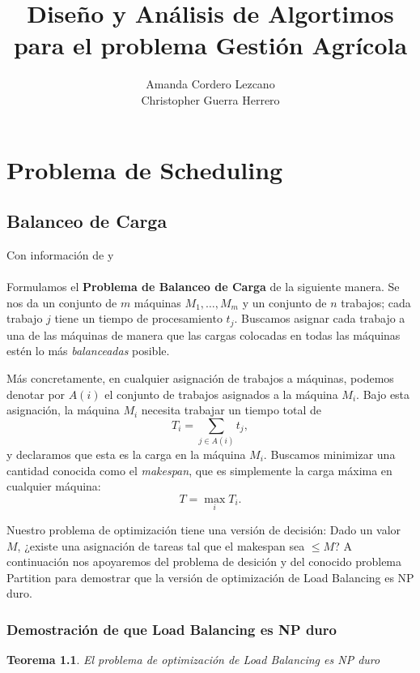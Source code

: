 \documentclass{report}
\title{Diseño y Análisis de Algortimos para el problema Gestión Agrícola}
\author{Amanda Cordero Lezcano\\Christopher Guerra Herrero}
\date{}
\newtheorem{theorem}{Teorema} %
\begin{document}
	
	\maketitle
	\tableofcontents
	\chapter{Problema de Scheduling}
	
	\section{Balanceo de Carga}
	{Con información de \cite{Kleinberg2005} y \cite{Garey1979}\\\\}
	Formulamos el \textbf{Problema de Balanceo de Carga} de la siguiente manera. Se nos da un conjunto de \( m \) máquinas \( M_1, \dots, M_m \) y un conjunto de \( n \) trabajos; cada trabajo \( j \) tiene un tiempo de procesamiento \( t_j \). Buscamos asignar cada trabajo a una de las máquinas de manera que las cargas colocadas en todas las máquinas estén lo más \textit{balanceadas} posible.
	
	Más concretamente, en cualquier asignación de trabajos a máquinas, podemos denotar por \( A(i) \) el conjunto de trabajos asignados a la máquina \( M_i \). Bajo esta asignación, la máquina \( M_i \) necesita trabajar un tiempo total de
	\[
	T_i = \sum_{j \in A(i)} t_j,
	\]
	y declaramos que esta es la carga en la máquina \( M_i \). Buscamos minimizar una cantidad conocida como el \textit{makespan}, que es simplemente la carga máxima en cualquier máquina:
	\[
	T = \max_i T_i.
	\]
	


	Nuestro problema de optimización tiene una versión de decisión: Dado un valor $ M $, ¿existe una asignación de tareas tal que el makespan sea $ \leq M $?
	A continuación nos apoyaremos del problema de desición y del conocido problema Partition para demostrar que la versión de optimización de Load Balancing es NP duro.
	
	\subsection{Demostración de que Load Balancing es NP duro}
	
	\begin{theorem}
		El problema de optimización de Load Balancing es NP duro
	\end{theorem}
	
\end{document}
